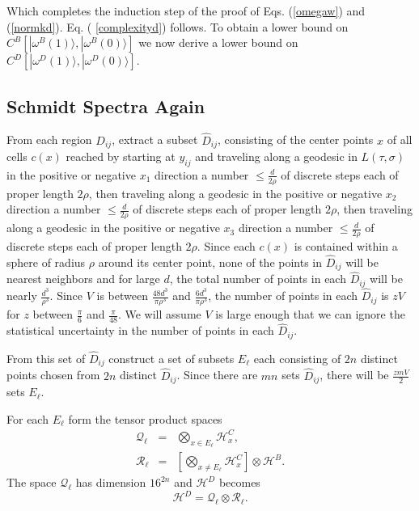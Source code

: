 \documentclass[twocolumn,amsmath,amssymb]{revtex4-1}
\begin{document}
Which completes the induction step of the proof of Eqs. (\ref{omegaw}) and (\ref{normkd}).
Eq. ( \ref{complexityd}) follows. To obtain a lower bound on $C^B[ |\omega^B(1) \rangle , |\omega^B( 0) \rangle ]$
we now derive a lower bound on $C^D[ |\omega^D(1) \rangle , |\omega^D( 0) \rangle ]$.



\subsection{\label{subsec:schmidtspectrar} Schmidt Spectra Again}


From each region $D_{ij}$, extract a subset $\hat{D}_{ij}$,
consisting of the center points $x$ of all cells $c(x)$ reached 
by starting at $y_{ij}$ and
traveling along a geodesic in $L(\tau, \sigma)$
in the positive or negative $x_1$ direction 
a number $\le \frac{d}{2 \rho}$ of discrete steps each of proper length $2 \rho$,
then traveling along a geodesic
in the positive or negative $x_2$ direction 
a number $\le \frac{d}{2 \rho}$ of discrete steps each of proper length $2 \rho$,
then traveling along a geodesic
in the positive or negative $x_3$ direction 
a number $\le \frac{d}{2 \rho}$ of discrete steps each of proper length $2 \rho$.
Since each $c(x)$ is contained within a sphere of radius $\rho$ around
its center point, none of the points in $\hat{D}_{ij}$ will be nearest neighbors
and for large $d$, the total number of points in each $\hat{D}_{ij}$ will
be nearly $\frac{d^3}{\rho^3}$.  Since $V$ is
between $\frac{48 d^3}{\pi \rho^3}$ and $\frac{ 6 d^3}{\pi \rho^3}$,
the number of points in each $\hat{D}_{ij}$ is $z V$ for
$z$ between $\frac{\pi}{6}$ and $\frac{\pi}{48}$.
We will assume $V$ is large enough that we can
ignore the statistical
uncertainty in the number of points in each $\hat{D}_{ij}$.


From this set of $\hat{D}_{ij}$ construct a set of subsets $E_\ell$ 
each consisting of $2n$ distinct points chosen from $2n$ distinct $\hat{D}_{ij}$.
Since there are $m n$ sets $\hat{D}_{ij}$, there will be $\frac{z m V}{2}$
sets $E_\ell$.

For each $E_\ell$ form the 
tensor product spaces
\begin{subequations}
\begin{eqnarray}
\label{defqell1}
\mathcal{Q}_\ell &=& \bigotimes_{x \in E_\ell} \mathcal{H}_x^C, \\
\label{defrell1}
\mathcal{R}_\ell &=& [\bigotimes_{x \ne E_\ell} \mathcal{H}_x^C] \otimes  \mathcal{H}^B.
\end{eqnarray}
\end{subequations}
The space $\mathcal{Q}_\ell$ has dimension $16^{2n}$ and
$\mathcal{H}^D$ becomes 
\begin{equation}
\label{deftp1}
\mathcal{H}^D = \mathcal{Q}_\ell \otimes \mathcal{R}_\ell.
\end{equation}
\end{document}
